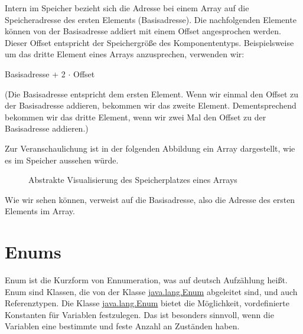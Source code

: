 \documentclass{tuda-pub}
\begin{document}
  \begin{note}[title=Information:]
    Intern im Speicher bezieht sich die Adresse bei einem Array auf die Speicheradresse des
    ersten Elements (Basisadresse). Die nachfolgenden Elemente können von der Basisadresse
    addiert mit einem Offset angesprochen werden. Dieser Offset entspricht der Speichergröße des
    Komponententyps.
    \br
    Beispielsweise um das dritte Element eines Arrays anzusprechen, verwenden wir:

    \begin{center}
      Basisadresse + 2 \(\cdot\) Offset
    \end{center}

    (Die Basisadresse entspricht dem ersten Element. Wenn wir einmal den Offset zu der
    Basisadresse addieren, bekommen wir das zweite Element. Dementsprechend bekommen wir das
    dritte Element, wenn wir zwei Mal den Offset zu der Basisadresse addieren.)

    \br

    Zur Veranschaulichung ist in der folgenden Abbildung ein Array dargestellt, wie es im
    Speicher aussehen würde.

    \begin{figure}[H]
      \centering
      \begin{memory}
      \end{memory}
      \caption{Abstrakte Visualisierung des Speicherplatzes eines Arrays }
    \end{figure}

    Wie wir sehen können, verweist  auf die Basisadresse, also die Adresse des
    ersten Elements im Array.
  \end{note}

  \clearpage


  \section{Enums}
  Enum ist die Kurzform von Ennumeration, was auf deutsch Aufzählung heißt. Enum sind Klassen,
  die von der Klasse
  \href{https://docs.oracle.com/en/java/javase/11/docs/api/java.base/java/lang/Enum.html}
  {java.lang.Enum} abgeleitet sind, und auch Referenztypen. Die Klasse
  \href{https://docs.oracle.com/en/java/javase/11/docs/api/java.base/java/lang/Enum.html}
  {java.lang.Enum} bietet die Möglichkeit, vordefinierte Konstanten für Variablen festzulegen.
  Das ist besonders sinnvoll, wenn die Variablen eine bestimmte und feste Anzahl an Zuständen haben.
\end{document}
